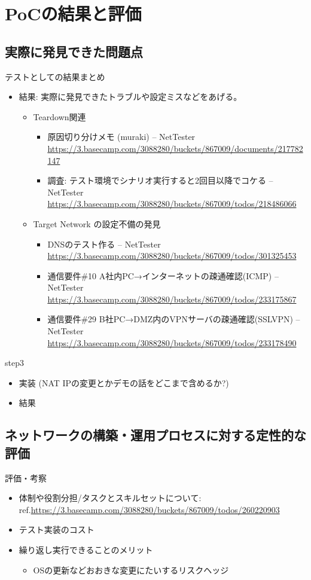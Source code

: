 \section{PoCの結果と評価}

\subsection{実際に発見できた問題点}
テストとしての結果まとめ
\begin{itemize}
  \item 結果: 実際に発見できたトラブルや設定ミスなどをあげる。
       \begin{itemize}
        \item Teardown関連
              \begin{itemize}
               \item 原因切り分けメモ (muraki) – NetTester \url{https://3.basecamp.com/3088280/buckets/867009/documents/217782147}
               \item 調査: テスト環境でシナリオ実行すると2回目以降でコケる – NetTester \url{https://3.basecamp.com/3088280/buckets/867009/todos/218486066}
              \end{itemize}
        \item Target Network の設定不備の発見
              \begin{itemize}
               \item DNSのテスト作る – NetTester \url{https://3.basecamp.com/3088280/buckets/867009/todos/301325453}
               \item 通信要件\#10 A社内PC→インターネットの疎通確認(ICMP) – NetTester \url{https://3.basecamp.com/3088280/buckets/867009/todos/233175867}
               \item 通信要件\#29 B社PC→DMZ内のVPNサーバの疎通確認(SSLVPN) – NetTester \url{https://3.basecamp.com/3088280/buckets/867009/todos/233178490}
              \end{itemize}
       \end{itemize}
\end{itemize}

step3
\begin{itemize}
 \item 実装 (NAT IPの変更とかデモの話をどこまで含めるか?)
 \item 結果
\end{itemize}

\subsection{ネットワークの構築・運用プロセスに対する定性的な評価}
評価・考察
\begin{itemize}
 \item 体制や役割分担/タスクとスキルセットについて: ref.\url{https://3.basecamp.com/3088280/buckets/867009/todos/260220903}
 \item テスト実装のコスト
 \item 繰り返し実行できることのメリット
       \begin{itemize}
        \item OSの更新などおおきな変更にたいするリスクヘッジ
       \end{itemize}
\end{itemize}


